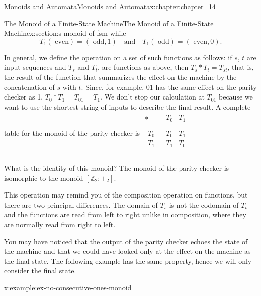 \documentclass[twoside,10pt,]{book}
\numberwithin{equation}{section}
\begin{document}
\begin{chapterptx}{Monoids and Automata}{}{Monoids and Automata}{}{}{x:chapter:chapter_14}
\begin{sectionptx}{The Monoid of a Finite-State Machine}{}{The Monoid of a Finite-State Machine}{}{}{x:section:s-monoid-of-fsm}
while%
\begin{equation*}
T_1(\textrm{ even})=(\textrm{ odd},1)  \quad \textrm{and} \quad T_1(\textrm{ odd})=(\textrm{ even},0)\textrm{.}
\end{equation*}
%
\par
In general, we define the operation on a set of such functions as follows: if \(s\), \(t\) are input sequences and \(T_s\) and \(T_t\), are functions as above, then \(T_s*T_t=T_{st}\), that is, the result of the function that summarizes the effect on the machine by the concatenation of \(s\) with \(t\). Since, for example, 01 has the same effect on the parity checker as 1, \(T_0*T_1=T_{01}=T_1\). We don't stop our calculation at \(T_{01}\) because we want to use the shortest string of inputs to describe the final result. A complete table for the monoid of the parity checker is \(\begin{array}{c|c}
* & 
\begin{array}{cc}
T_0 & T_1 \\
\end{array}
\\
\hline
\begin{array}{c}
T_0 \\
T_1 \\
\end{array}
& 
\begin{array}{cc}
T_0 & T_1 \\
T_1 & T_0 \\
\end{array}
\\
\end{array}\)%
\par
What is the identity of this monoid? The monoid of the parity checker is isomorphic to the monoid \(\left[\mathbb{Z}_2; +_2\right]\).%
\par
This operation may remind you of the composition operation on functions, but there are two principal differences. The domain of \(T_s\) is not the codomain of \(T_t\) and the functions are read from left to right unlike in composition, where they are normally read from right to left.%
\par
You may have noticed that the output of the parity checker echoes the state of the machine and that we could have looked only at the effect on the machine as the final state. The following example has the same property, hence we will only consider the final state.%
\begin{example}{}{x:example:ex-no-consecutive-ones-monoid}%

\end{example}
\end{sectionptx}
\end{chapterptx}
\end{document}
